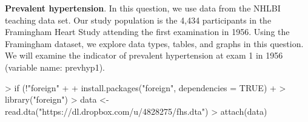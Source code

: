 \documentclass{article}
\begin{document}
\textbf{Prevalent hypertension}. In this question, we use data from the NHLBI teaching data set.  Our study population is the 4,434 participants in the Framingham Heart Study attending the first examination in 1956.   Using the Framingham dataset, we explore data types, tables, and graphs in this question.  We will examine the indicator of prevalent hypertension at exam 1 in 1956 (variable name: prevhyp1).  
\begin{Schunk}
\begin{Sinput}
> if (!"foreign" %
+ {
+   install.packages("foreign", dependencies = TRUE)
+ }
> library("foreign") 
> data <- read.dta("https://dl.dropbox.com/u/4828275/fhs.dta")
> attach(data)
\end{Sinput}
\end{Schunk}
\end{document}
